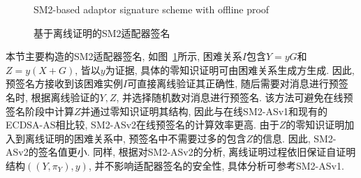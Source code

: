 \documentclass[review]{jcr}
\begin{document}
\begin{figure}
\centering 
{}
\caption{基于离线证明的SM2适配器签名}{SM2-based adaptor signature scheme with offline proof}
\label{SM2-based adaptor signature scheme with offline proof}
\end{figure}

本节主要构造的SM2适配器签名, 如图~\ref{SM2-based adaptor signature scheme with offline proof}所示, 困难关系$I$包含$Y=yG$和$Z=y(X+G)$, 皆以$y$为证据, 具体的零知识证明可由困难关系生成方生成. 因此, 预签名方接收到该困难实例$I$可直接离线验证其正确性, 随后需要对消息进行预签名时, 根据离线验证的$Y, Z$, 并选择随机数对消息进行预签名. 该方法可避免在线预签名阶段中计算$Z$并通过零知识证明其结构, 因此与在线SM2-ASv1和现有的ECDSA-AS相比较, SM2-ASv2在线预签名的计算效率更高. 由于$Z$的零知识证明加入到离线证明的困难关系中, 预签名中不需要过多的包含$Z$的信息.  因此, SM2-ASv2的签名值更小. 同样, 根据对SM2-ASv2的分析, 离线证明过程依旧保证自证明结构$((Y, \pi_Y),y)$, 并不影响适配器签名的安全性, 具体分析可参考SM2-ASv1.
\end{document}
